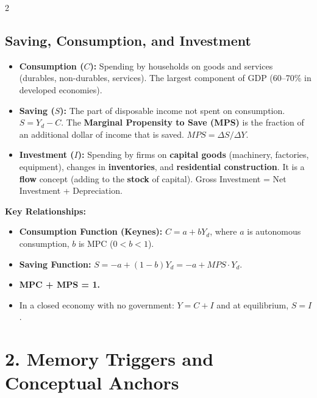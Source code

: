 \documentclass[10pt,a4paper]{article}
\begin{document}
\begin{multicols}{2}
\subsection*{Saving, Consumption, and Investment}
\begin{itemize}[leftmargin=*,nosep]
    \item \textbf{Consumption ($C$):} Spending by households on goods and services (durables, non-durables, services). The largest component of GDP (60--70\% in developed economies).
    \item \textbf{Saving ($S$):} The part of disposable income not spent on consumption. $S = Y_d - C$. The \textbf{Marginal Propensity to Save (MPS)} is the fraction of an additional dollar of income that is saved. $MPS = \Delta S / \Delta Y$.
    \item \textbf{Investment ($I$):} Spending by firms on \textbf{capital goods} (machinery, factories, equipment), changes in \textbf{inventories}, and \textbf{residential construction}. It is a \textbf{flow} concept (adding to the \textbf{stock} of capital). Gross Investment = Net Investment + Depreciation.
\end{itemize}

\textbf{Key Relationships:}
\begin{itemize}[nosep]
    \item \textbf{Consumption Function (Keynes):} $C = a + bY_d$, where $a$ is autonomous consumption, $b$ is MPC ($0 < b < 1$).
    \item \textbf{Saving Function:} $S = -a + (1-b)Y_d = -a + MPS \cdot Y_d$.
    \item \textbf{MPC + MPS = 1.}
    \item In a closed economy with no government: $Y = C + I$ and at equilibrium, $S = I$.
\end{itemize}

\section*{2. Memory Triggers and Conceptual Anchors}


\end{multicols}
\end{document}
